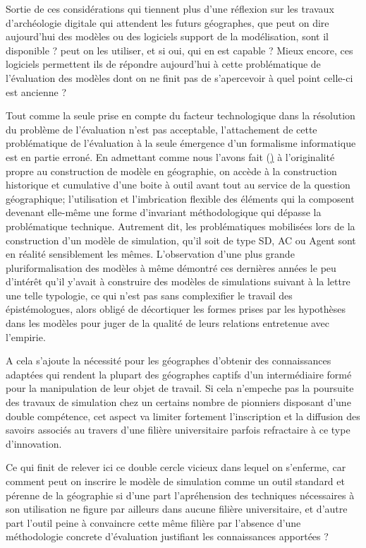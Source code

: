 Sortie de ces considérations qui tiennent plus d'une réflexion sur les travaux d'archéologie digitale qui attendent les futurs géographes, que peut on dire aujourd'hui des modèles ou des logiciels support de la modélisation, sont il disponible ? peut on les utiliser, et si oui, qui en est capable ? Mieux encore, ces logiciels permettent ils de répondre aujourd'hui à cette problématique de l'évaluation des modèles dont on ne finit pas de s'apercevoir à quel point celle-ci est ancienne ?


Tout comme la seule prise en compte du facteur technologique dans la résolution du problème de l'évaluation n'est pas acceptable, l'attachement de cette problématique de l'évaluation à la seule émergence d'un formalisme informatique est en partie erroné. En admettant comme nous l'avons fait (\href{section}) à l'originalité propre au construction de modèle en géographie, on accède à la construction historique et cumulative d'une boite à outil avant tout au service de la question géographique; l'utilisation et l'imbrication flexible des éléments qui la composent devenant elle-même une forme d'invariant méthodologique qui dépasse la problématique technique. Autrement dit, les problématiques mobilisées lors de la construction d'un modèle de simulation, qu'il soit de type SD, AC ou Agent sont en réalité sensiblement les mêmes. L'observation d'une plus grande pluriformalisation des modèles à même démontré ces dernières années le peu d'intérêt qu'il y'avait à construire des modèles de simulations suivant à la lettre une telle typologie, ce qui n'est pas sans complexifier le travail des épistémologues, alors obligé de décortiquer les formes prises par les hypothèses dans les modèles pour juger de la qualité de leurs relations entretenue avec l'empirie. 

A cela s'ajoute la nécessité pour les géographes d'obtenir des connaissances adaptées qui rendent la plupart des géographes captifs d'un intermédiaire formé pour la manipulation de leur objet de travail. Si cela n'empeche pas la poursuite des travaux de simulation chez un certains nombre de pionniers disposant d'une double compétence, cet aspect va limiter fortement l'inscription et la diffusion des savoirs associés au travers d'une filière universitaire parfois refractaire à ce type d'innovation. 

Ce qui finit de relever ici ce double cercle vicieux dans lequel on s'enferme, car comment peut on inscrire le modèle de simulation comme un outil standard et pérenne de la géographie si d'une part l'apréhension des techniques nécessaires à son utilisation ne figure par ailleurs dans aucune filière universitaire, et d'autre part l'outil peine à convaincre cette même filière par l'absence d'une méthodologie concrete d'évaluation justifiant les connaissances apportées ?    

